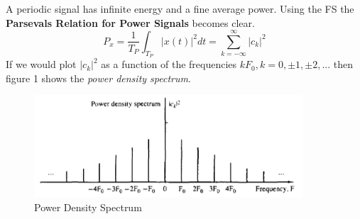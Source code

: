 \documentclass{article} %
\begin{document}
	A periodic signal has infinite energy and a fine average power. Using the FS the \textbf{Parsevals Relation for Power Signals} becomes clear.
	\begin{equation}
 	P_x = \frac{1}{T_P} \int_{T_P} |x(t)|^2dt = \sum_{k=-\infty}^{\infty} |c_k|^2
	\end{equation}
	If we would plot $|c_k|^2$ as a function of the frequencies $kF_0, k=0,\pm 1, \pm 2,...$ then figure 1 shows the \textit{power density spectrum}.
	
	\begin{figure}[h]
    \centering
	\includegraphics[width=10cm]{pds}
	\caption{Power Density Spectrum}
	\end{figure}
	
\end{document}
